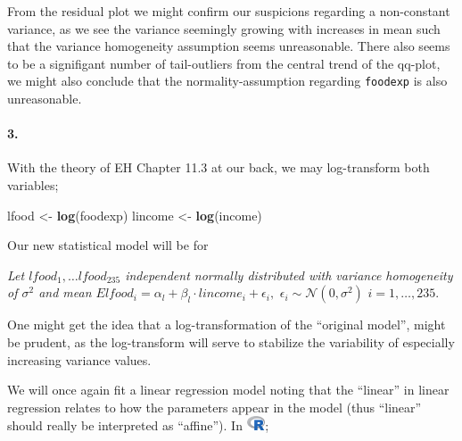 \documentclass[
]{article}
\newenvironment{Shaded}{\begin{snugshade}}{\end{snugshade}}
\newcommand{\KeywordTok}[1]{\textcolor[rgb]{0.13,0.29,0.53}{\textbf{#1}}}
\newcommand{\NormalTok}[1]{#1}
\newcommand{\StringTok}[1]{\textcolor[rgb]{0.31,0.60,0.02}{#1}}
\begin{document}
From the residual plot we might confirm our suspicions regarding a
non-constant variance, as we see the variance seemingly growing with
increases in mean such that the variance homogeneity assumption seems
unreasonable. There also seems to be a signifigant number of
tail-outliers from the central trend of the qq-plot, we might also
conclude that the normality-assumption regarding \texttt{foodexp} is
also unreasonable.

\hypertarget{section-74}{%
\paragraph{\texorpdfstring{\textbf{3.}}{3.}}\label{section-74}}

With the theory of EH Chapter 11.3 at our back, we may log-transform
both variables;

\begin{Shaded}
\begin{Highlighting}[]
\NormalTok{lfood <-}\StringTok{ }\KeywordTok{log}\NormalTok{(foodexp)}
\NormalTok{lincome <-}\StringTok{ }\KeywordTok{log}\NormalTok{(income)}
\end{Highlighting}
\end{Shaded}

Our new statistical model will be for

\emph{Let \(lfood_1,\ldots lfood_{235}\) independent normally
distributed with variance homogeneity of \(\sigma^2\) and mean
\(Elfood_i=\alpha_l+\beta_l\cdot lincome_i+\epsilon_i,\,\,\epsilon_i\sim\mathcal{N}\left({{0},{\sigma^2}}\right)\,\,i=1,\ldots,235.\)}

One might get the idea that a log-transformation of the ``original
model'', might be prudent, as the log-transform will serve to stabilize
the variability of especially increasing variance values.

We will once again fit a linear regression model noting that the
``linear'' in linear regression relates to how the parameters appear in
the model (thus ``linear'' should really be interpreted as ``affine'').
In \includegraphics[width=\textwidth,height=0.16667in]{R_logo.png};
\end{document}

